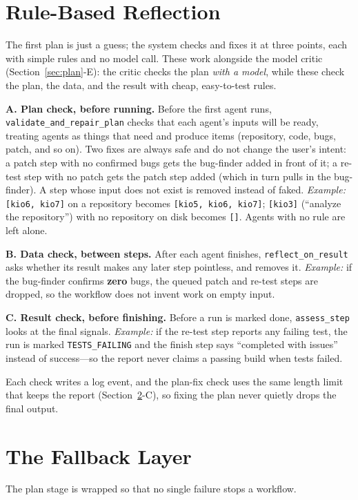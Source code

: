 \documentclass[conference]{IEEEtran}
\begin{document}
\section{Rule-Based Reflection}
\label{sec:reflect}
The first plan is just a guess; the system checks and fixes it at three points, each
with simple rules and no model call. These work alongside the model critic
(Section~\ref{sec:plan}-E): the critic checks the plan \emph{with a model}, while these
check the plan, the data, and the result with cheap, easy-to-test rules.

\textbf{A. Plan check, before running.} Before the first agent runs,
\texttt{validate\_and\_repair\_plan} checks that each agent's inputs will be ready,
treating agents as things that need and produce items (repository, code, bugs,
patch, and so on). Two fixes are always safe and do not change the user's intent: a
patch step with no confirmed bugs gets the bug-finder added in front of it; a
re-test step with no patch gets the patch step added (which in turn pulls in the
bug-finder). A step whose input does not exist is removed instead of faked.
\emph{Example:} \texttt{[kio6, kio7]} on a repository becomes
\texttt{[kio5, kio6, kio7]}; \texttt{[kio3]} (``analyze the repository'') with no
repository on disk becomes \texttt{[]}. Agents with no rule are left alone.

\textbf{B. Data check, between steps.} After each agent finishes,
\texttt{reflect\_on\_result} asks whether its result makes any later step pointless,
and removes it. \emph{Example:} if the bug-finder confirms \textbf{zero} bugs, the
queued patch and re-test steps are dropped, so the workflow does not invent work on
empty input.

\textbf{C. Result check, before finishing.} Before a run is marked done,
\texttt{assess\_step} looks at the final signals. \emph{Example:} if the re-test
step reports any failing test, the run is marked \texttt{TESTS\_FAILING} and the
finish step says ``completed with issues'' instead of success---so the report never
claims a passing build when tests failed.

Each check writes a log event, and the plan-fix check uses the same length limit
that keeps the report (Section~\ref{sec:resil}-C), so fixing the plan never quietly drops
the final output.

\section{The Fallback Layer}
\label{sec:resil}
The plan stage is wrapped so that no single failure stops a workflow.
\end{document}
